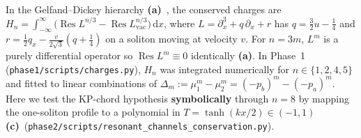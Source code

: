 \documentclass[11pt,a4paper]{article}
\newcommand{\La}{\textsf{\textbf{(a)}}\xspace}
\newcommand{\Lc}{\textsf{\textbf{(c)}}\xspace}
\newcommand{\dd}{\mathrm{d}}
\newcommand{\Res}{\operatorname{Res}}
\newcommand{\scons}{\texttt{phase2/\allowbreak scripts/\allowbreak resonant\_\allowbreak channels\_\allowbreak conservation.py}}
\theoremstyle{remark}
\begin{document}
In the Gelfand--Dickey hierarchy \La~\cite{Dickey}, the conserved charges are
$H_n = \int_{-\infty}^\infty \big(\Res L^{n/3} - \Res L_{\mathrm{vac}}^{n/3}\big)\,\dd x$,
where $L = \partial_x^3 + q\,\partial_x + r$ has $q = \frac{3}{2}u - \frac{1}{4}$
and $r = \frac{1}{2}q_x - \frac{v}{2\sqrt{3}}(q+\frac{1}{4})$ on a soliton
moving at velocity $v$. For $n = 3m$, $L^m$ is a purely differential operator so
$\Res L^m \equiv 0$ identically \La. In Phase~1 (\texttt{phase1/\allowbreak scripts/\allowbreak charges.py}),
$H_n$ was integrated numerically for $n \in \{1,2,4,5\}$ and fitted to linear
combinations of $\Delta_m := \mu_1^m - \mu_2^m = (-p_b)^m - (-p_a)^m$. Here we
test the KP-chord hypothesis \textbf{symbolically} through $n = 8$ by mapping
the one-soliton profile to a polynomial in $T = \tanh(kx/2) \in (-1,1)$ \Lc\ (\scons).
\end{document}
